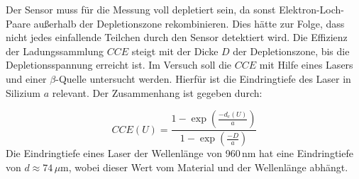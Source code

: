 Der Sensor muss für die Messung voll depletiert sein, da sonst Elektron-Loch-Paare
außerhalb der Depletionszone rekombinieren. Dies hätte zur Folge, dass nicht jedes einfallende Teilchen durch den Sensor detektiert wird. Die Effizienz der Ladungssammlung
$CCE$ steigt mit der Dicke $D$ der Depletionszone, bis die Depletionsspannung erreicht ist.
Im Versuch soll die $CCE$ mit Hilfe eines Lasers und einer $\beta$-Quelle untersucht werden. Hierfür ist die
Eindringtiefe des Laser in Silizium $a$ relevant. Der Zusammenhang ist gegeben durch:

\begin{equation}
    \label{CCE}
    CCE(U)=\frac{1-\exp(\frac{-d_c(U)}{a})}{1-\exp(\frac{-D}{a})}
\end{equation}
Die Eindringtiefe eines Laser der Wellenlänge von 960$\,$nm \cite{skript} hat eine Eindringtiefe
von $d \approx 74\,\mu$m, wobei dieser Wert vom  Material und der Wellenlänge abhängt.
